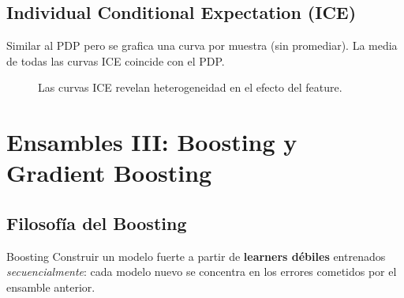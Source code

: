 \documentclass[12pt, a4paper]{article}
\begin{document}
\subsection{Individual Conditional Expectation (ICE)}

Similar al PDP pero se grafica una curva por muestra (sin promediar).
La media de todas las curvas ICE coincide con el PDP.

\begin{figure}[H]
\centering
{}
\caption{Las curvas ICE revelan heterogeneidad en el efecto del feature.}
\end{figure}

\section{Ensambles III: Boosting y Gradient Boosting}

\subsection{Filosofía del Boosting}

\begin{defbox}{Boosting}
  Construir un modelo fuerte a partir de \textbf{learners débiles} entrenados
  \emph{secuencialmente}: cada modelo nuevo se concentra en los errores cometidos
  por el ensamble anterior.
\end{defbox}
\end{document}
